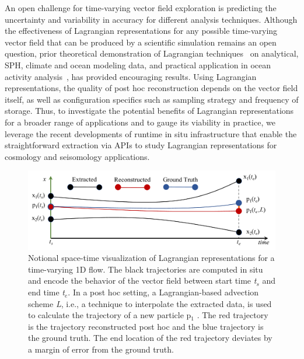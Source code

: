 An open challenge for time-varying vector field exploration is predicting the uncertainty and variability in accuracy for different analysis techniques.
%
Although the effectiveness of Lagrangian representations for any possible time-varying vector field that can be produced by a scientific simulation remains an open question, prior theoretical demonstration of Lagrangian techniques~\cite{agranovsky2014improved}\cite{chandler2015interpolation}\cite{bujack2015lagrangian}\cite{chandler2016analysis}\cite{hummel2016error}\cite{sane2018revisiting}\cite{sane2019interpolation}\cite{rapp2019void}\cite{Jakob20} on analytical, SPH, climate and ocean modeling data, and practical application in ocean activity analysis~\cite{envirvis.20171099}\cite{siegfried2019tropical}, has provided encouraging results.
%
Using Lagrangian representations, the quality of post hoc reconstruction depends on the vector field itself, as well as configuration specifics such as sampling strategy and frequency of storage.
%
Thus, to investigate the potential benefits of Lagrangian representations for a broader range of applications and to gauge its viability in practice, we leverage the recent developments of runtime in situ infrastructure that enable the straightforward extraction via APIs to study Lagrangian representations for cosmology and seisomology applications.   

\begin{figure}[!t]
\centering
\includegraphics[width=0.85\linewidth]{Images/sample.pdf}
\vspace{-3mm}
\caption{Notional space-time visualization of Lagrangian representations for a time-varying 1D flow. The black trajectories are computed in situ and encode the behavior of the vector field between start time \textit{t$_{s}$} and end time \textit{t$_{e}$}. In a post hoc setting, a Lagrangian-based advection scheme \textit{L}, i.e., a technique to interpolate the extracted data, is used to calculate the trajectory of a new particle p$_{1}$ . The red trajectory is the trajectory reconstructed post hoc and the blue trajectory is the ground truth. The end location of the red trajectory deviates by a margin of error from the ground truth.}
\vspace{-8mm}
\label{fig:sample}
\end{figure}

